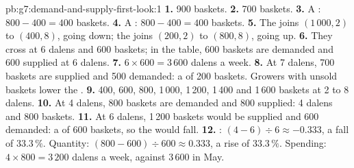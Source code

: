\begin{solution}{pb:g7:demand-and-supply-first-look:1}
\textbf{1.} 900 baskets.
\textbf{2.} 700 baskets.
\textbf{3.} A : $800 - 400 = 400$ baskets.
\textbf{4.} A : $800 - 400 = 400$ baskets.
\textbf{5.} The  joins $(1\,000, 2)$ to $(400, 8)$, going down; the 
joins $(200, 2)$ to $(800, 8)$, going up.
\textbf{6.} They cross at 6 dalens and 600 baskets; in the table, 600 baskets are demanded and
600 supplied at 6 dalens.
\textbf{7.} $6 \times 600 = 3\,600$ dalens a week.
\textbf{8.} At 7 dalens, 700 baskets are supplied and 500 demanded: a  of 200
baskets. Growers with unsold baskets lower the .
\textbf{9.} 400, 600, 800, 1\,000, 1\,200, 1\,400 and 1\,600 baskets at 2 to 8 dalens.
\textbf{10.} At 4 dalens, 800 baskets are demanded and 800 supplied: 4 dalens and 800 baskets.
\textbf{11.} At 6 dalens, 1\,200 baskets would be supplied and 600 demanded: a 
of 600 baskets, so the  would fall.
\textbf{12.} : $(4 - 6) \div 6 \approx -0.333$, a fall of $33.3\,\%$. Quantity:
$(800 - 600) \div 600 \approx 0.333$, a rise of $33.3\,\%$. Spending: $4 \times 800 = 3\,200$
dalens a week, against $3\,600$ in May.
\end{solution}
